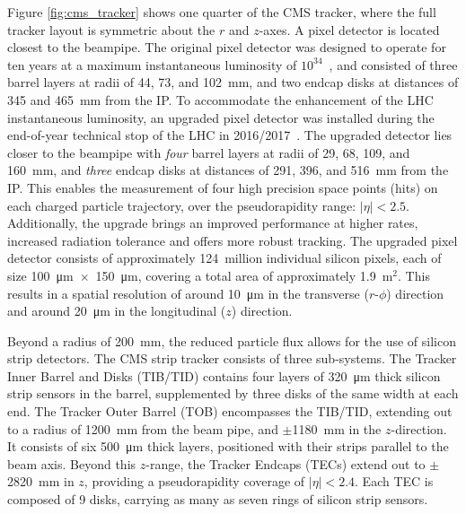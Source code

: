 Figure \ref{fig:cms_tracker} shows one quarter of the CMS tracker, where the full tracker layout is symmetric about the $r$ and $z$-axes. A pixel detector is located closest to the beampipe. The original pixel detector was designed to operate for ten years at a maximum instantaneous luminosity of $10^{34}$~\lumi, and consisted of three barrel layers at radii of 44, 73, and 102~mm, and two endcap disks at distances of 345 and 465~mm from the IP. To accommodate the enhancement of the LHC instantaneous luminosity, an upgraded pixel detector was installed during the end-of-year technical stop of the LHC in 2016/2017~\cite{CMS:2012sda}. The upgraded detector lies closer to the beampipe with \textit{four} barrel layers at radii of 29, 68, 109, and 160~mm, and \textit{three} endcap disks at distances of 291, 396, and 516~mm from the IP. This enables the measurement of four high precision space points (hits) on each charged particle trajectory, over the pseudorapidity range: $|\eta|<2.5$. Additionally, the upgrade brings an improved performance at higher rates, increased radiation tolerance and offers more robust tracking. The upgraded pixel detector consists of approximately 124~million individual silicon pixels, each of size \SI{100}{\micro\meter}~$\times$~\SI{150}{\micro\meter}, covering a total area of approximately 1.9~m$^2$. This results in a spatial resolution of around \SI{10}{\micro\meter} in the transverse ($r$-$\phi$) direction and around \SI{20}{\micro\meter} in the longitudinal ($z$) direction.

Beyond a radius of 200~mm, the reduced particle flux allows for the use of silicon strip detectors. The CMS strip tracker consists of three sub-systems. The Tracker Inner Barrel and Disks (TIB/TID) contains four layers of \SI{320}{\micro\meter} thick silicon strip sensors in the barrel, supplemented by three disks of the same width at each end. The Tracker Outer Barrel (TOB) encompasses the TIB/TID, extending out to a radius of 1200~mm from the beam pipe, and $\pm$1180~mm in the $z$-direction. It consists of six \SI{500}{\micro\meter} thick layers, positioned with their strips parallel to the beam axis. Beyond this $z$-range, the Tracker Endcaps (TECs) extend out to $\pm$2820~mm in $z$, providing a pseudorapidity coverage of $|\eta|<2.4$. Each TEC is composed of 9 disks, carrying as many as seven rings of silicon strip sensors. 


